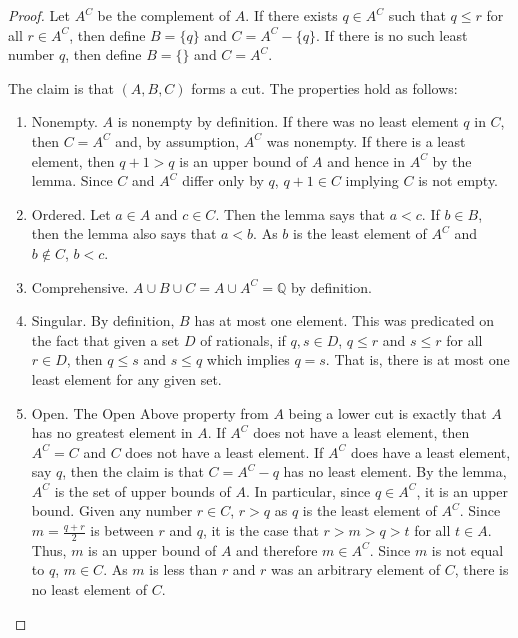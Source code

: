 \documentclass[12pt]{article}
\begin{document}
\begin{proof}
    Let $A^C$ be the complement of $A$. If there exists $q \in A^C$ such that $q \leq r$ for all $r \in A^C$, then define $B = \{q\}$ and $C = A^C - \{q\}$. If there is no such least number $q$, then define $B = \{\}$ and $C = A^C$. 

    The claim is that $(A, B, C)$ forms a cut. The properties hold as follows:

    \begin{enumerate}
        \item Nonempty. $A$ is nonempty by definition. If there was no least element $q$ in $C$, then $C = A^C$ and, by assumption, $A^C$ was nonempty. If there is a least element, then $q+1 > q$ is an upper bound of $A$ and hence in $A^C$ by the lemma. Since $C$ and $A^C$ differ only by $q$, $q+1 \in C$ implying $C$ is not empty. 
        \item Ordered. Let $a \in A$ and $c \in C$. Then the lemma says that $ a< c$. If $b \in B$, then the lemma also says that $a < b$. As $b$ is the least element of $A^C$ and $b \notin C$, $ b < c$. 
        \item Comprehensive. $A \cup B \cup C = A \cup A^C = \mathbb{Q}$ by definition. 
        \item Singular. By definition, $B$ has at most one element. This was predicated on the fact that given a set $D$ of rationals, if $q, s \in D$, $q \leq r$ and $s \leq r$ for all $r \in D$, then $q \leq s$ and $s \leq q$ which implies $q = s$. That is, there is at most one least element for any given set. 
        \item Open. The Open Above property from $A$ being a lower cut is exactly that $A$ has no greatest element in $A$. If $A^C$ does not have a least element, then $A^C = C$ and $C$ does not have a least element. If $A^C$ does have a least element, say $q$, then the claim is that $C= A^C - {q}$ has no least element. By the lemma, $A^C$ is the set of upper bounds of $A$. In particular, since $q \in A^C$, it is an upper bound. Given any number $r \in C$, $r > q$ as $q$ is the least element of $A^C$. Since $m = \frac{q+r}{2}$ is between $r$ and $q$, it is the case that $r > m > q > t$ for all $t \in A$. Thus, $m$ is an upper bound of $A$ and therefore $m \in A^C$. Since $m$ is not equal to $q$, $m \in C$. As $m$ is less than $r$ and $r$ was an arbitrary element of $C$, there is no least element of $C$. 
    \end{enumerate}
\end{proof}
\end{document}
